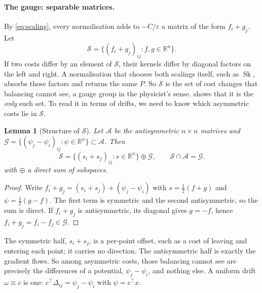 \documentclass{article}
\theoremstyle{plain}
\newtheorem{lemma}[theorem]{Lemma}
\theoremstyle{definition}
\theoremstyle{remark}
\newcommand{\R}{\mathbb{R}}
\newcommand{\eps}{\varepsilon}
\newcommand{\1}{\mathbf{1}}
\newcommand{\Sep}{\mathcal{S}}
\newcommand{\Asym}{\mathcal{A}}
\newcommand{\Grad}{\mathcal{G}}
\newcommand{\Sk}{\operatorname{Sk}}
\begin{document}
\paragraph{The gauge: separable matrices.}
By \eqref{eq:scaling}, every normalisation adds to $-C/\eps$ a matrix of
the form $f_i+g_j$. Let
\[
  \Sep=\{(f_i+g_j)_{ij}:f,g\in\R^n\}.
\]
If two costs differ by an element of $\Sep$, their kernels differ by
diagonal factors on the left and right. A normalisation that chooses
both scalings itself, such as $\Sk$, absorbs those factors and returns the
same $P$. So $\Sep$ is the set of cost changes that balancing cannot see,
a gauge group in the physicist's sense.  shows that
it is the \emph{only} such set. To read it in terms of drifts, we need to
know which asymmetric costs lie in $\Sep$.

\begin{lemma}[Structure of $\Sep$]
  \label{lem:sep}
  Let $\Asym$ be the antisymmetric $n\times n$ matrices and
  $\Grad=\{(\psi_j-\psi_i)_{ij}:\psi\in\R^n\}\subset\Asym$. Then
  \begin{equation}
    \Sep=\{(s_i+s_j)_{ij}:s\in\R^n\}\oplus\Grad,\qquad \Sep\cap\Asym=\Grad .
    \label{eq:sep}
  \end{equation}
  with $\oplus$ a direct sum of subspaces.
\end{lemma}

\begin{proof}
  Write $f_i+g_j=(s_i+s_j)+(\psi_j-\psi_i)$ with $s=\tfrac12(f+g)$ and
  $\psi=\tfrac12(g-f)$. The first term is symmetric and the second
  antisymmetric, so the sum is direct. If $f_i+g_j$ is antisymmetric, its
  diagonal gives $g=-f$, hence $f_i+g_j=f_i-f_j\in\Grad$.
\end{proof}

The symmetric half, $s_i+s_j$, is a per-point offset, such as a cost of
leaving and entering each point; it carries no direction. The
antisymmetric half is exactly the gradient flows. So among asymmetric
costs, those balancing cannot see are precisely the differences of a
potential, $\psi_j-\psi_i$, and nothing else. A uniform drift
$\omega\equiv c$ is one: $c^\top\Delta_{ij}=\psi_j-\psi_i$ with
$\psi=c^\top x$.
\end{document}
